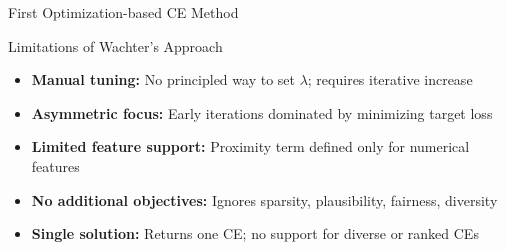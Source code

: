 \documentclass[10pt,compress,t,notes=noshow, xcolor=table]{beamer}
\begin{document}
\begin{frame}{First Optimization-based CE Method }
	
	


\end{frame}



\begin{frame}{Limitations of Wachter's Approach}
\vspace{0.2cm}

\begin{itemize}
  \item \textbf{Manual tuning:} No principled way to set \(\lambda\); requires iterative increase
  \item \textbf{Asymmetric focus:} Early iterations dominated by minimizing target loss
  \item \textbf{Limited feature support:} Proximity term defined only for numerical features
  \item \textbf{No additional objectives:} Ignores sparsity, plausibility, fairness, diversity
  \item \textbf{Single solution:} Returns one CE; no support for diverse or ranked CEs
\end{itemize}

\end{frame}
\end{document}
